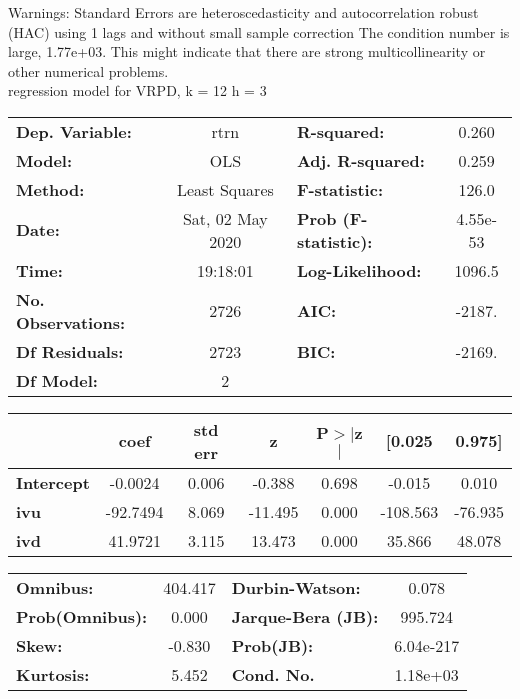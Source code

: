 Warnings: \newline
 [1] Standard Errors are heteroscedasticity and autocorrelation robust (HAC) using 1 lags and without small sample correction \newline
 [2] The condition number is large, 1.77e+03. This might indicate that there are \newline
 strong multicollinearity or other numerical problems.\\ 

regression model for VRPD, k = 12 h = 3\begin{center}
\begin{tabular}{lclc}
\toprule
\textbf{Dep. Variable:}    &       rtrn       & \textbf{  R-squared:         } &     0.260   \\
\textbf{Model:}            &       OLS        & \textbf{  Adj. R-squared:    } &     0.259   \\
\textbf{Method:}           &  Least Squares   & \textbf{  F-statistic:       } &     126.0   \\
\textbf{Date:}             & Sat, 02 May 2020 & \textbf{  Prob (F-statistic):} &  4.55e-53   \\
\textbf{Time:}             &     19:18:01     & \textbf{  Log-Likelihood:    } &    1096.5   \\
\textbf{No. Observations:} &        2726      & \textbf{  AIC:               } &    -2187.   \\
\textbf{Df Residuals:}     &        2723      & \textbf{  BIC:               } &    -2169.   \\
\textbf{Df Model:}         &           2      & \textbf{                     } &             \\
\bottomrule
\end{tabular}
\begin{tabular}{lcccccc}
                   & \textbf{coef} & \textbf{std err} & \textbf{z} & \textbf{P$> |$z$|$} & \textbf{[0.025} & \textbf{0.975]}  \\
\midrule
\textbf{Intercept} &      -0.0024  &        0.006     &    -0.388  &         0.698        &       -0.015    &        0.010     \\
\textbf{ivu}       &     -92.7494  &        8.069     &   -11.495  &         0.000        &     -108.563    &      -76.935     \\
\textbf{ivd}       &      41.9721  &        3.115     &    13.473  &         0.000        &       35.866    &       48.078     \\
\bottomrule
\end{tabular}
\begin{tabular}{lclc}
\textbf{Omnibus:}       & 404.417 & \textbf{  Durbin-Watson:     } &     0.078  \\
\textbf{Prob(Omnibus):} &   0.000 & \textbf{  Jarque-Bera (JB):  } &   995.724  \\
\textbf{Skew:}          &  -0.830 & \textbf{  Prob(JB):          } & 6.04e-217  \\
\textbf{Kurtosis:}      &   5.452 & \textbf{  Cond. No.          } &  1.18e+03  \\
\bottomrule
\end{tabular}
\end{center}

